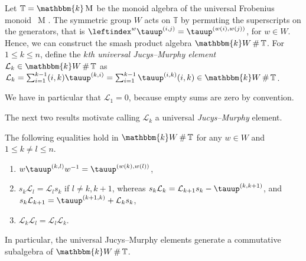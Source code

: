 \documentclass[a4paper,11pt]{amsart}
\numberwithin{equation}{subsection}
\theoremstyle{definition}
\theoremstyle{theorem}
\theoremstyle{remark}
\newcommand\CL{\mathcal{L}}
\newcommand\Sym{W}
\newcommand{\ttau}{\tauup}
\newcommand\kk{\mathbbm{k}}
\newcommand\nBraid{\operatorname{M}^{\operatorname{}}}
\newcommand\Tos{\mathbb{T}}
\DeclareMathOperator\Smash{\#}
\begin{document}
\begin{Definition}\label{D:universalJM}
Let $\Tos=\kk\nBraid$ be the monoid algebra of the universal Frobenius
monoid~$\nBraid$. The symmetric group $\Sym$ acts on $\Tos$ by permuting the
superscripts on the generators, that is
  $\leftindex^w\ttau^{(i,j)}=\ttau^{(w(i),w(j))}$, for
  $w\in\Sym$. Hence, we can construct the smash
  product algebra $\kk\Sym\Smash\Tos$.
  For $1\leq k\leq n$, define the \emph{$k$th universal Jucys--Murphy element} $\CL_{k}\in\kk\Sym\Smash\Tos$ as $\CL_{k}=\sum_{i=1}^{k-1}(i,k)\ttau^{(k,i)}=\sum_{i=1}^{k-1}\ttau^{(i,k)}(i,k)\in\kk\Sym\Smash\Tos$.
  \end{Definition}
  \begin{Remark}
  We have in particular that  $\CL_1=0$, because empty sums are zero  by convention.
    \end{Remark}
  The next two results motivate calling $\CL_{k}$ a universal
  \emph{Jucys--Murphy} element.
  \begin{Proposition}\label{P:CLProperties}
The following equalities hold in $\kk\Sym\Smash\Tos$ for any $w\in\Sym$ and $1\leq k\not=l\leq n$.
\begin{enumerate}
\item\label{La}$w\ttau^{(k,l)}w^{-1}=\ttau^{(w(k),w(l))}$,
\item\label{Lb} $s_k\CL_{l}=\CL_l s_k$ if $l\ne k, k+1$, whereas
 $s_k\CL_k=\CL_{k+1}s_k-\ttau ^{(k,k+1)}$,
 and
$s_k\CL_{k+1}=\ttau^{(k+1,k)}+\CL_ks_k$,
\item\label{Lc} $\CL_k\CL_l=\CL_l\CL_k$.
\end{enumerate}
In particular, the universal Jucys--Murphy elements generate a
commutative subalgebra of $\kk\Sym\Smash\Tos$.
\end{Proposition}
\end{document}
